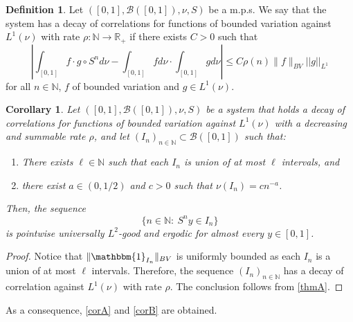 \documentclass[11pt]{amsart}
\numberwithin{equation}{section}
\newtheorem{corollary}[lemma]{Corollary}
\theoremstyle{definition}
\newtheorem{definition}[lemma]{Definition}
\theoremstyle{plain}
\newcommand{\N}{{\mathbb N}}
\begin{document}
\begin{definition}
    Let $([0,1],\mathcal{B}([0,1]),\nu,S)$ be a m.p.s. We say that the system has a decay of correlations for functions of bounded variation against $L^1(\nu)$ with rate $\rho\colon\N\to \mathbb{R}_{+}$ if there exists $C>0$ such that
    \[\left|\int_{[0,1]} f\cdot g\circ S^nd\nu-\int_{[0,1]} fd\nu \cdot \int_{[0,1]} gd\nu \right|\leq C\rho(n)\|f\|_{BV}||g||_{L^{1}}\]
    for all $n\in\N$, $f$ of bounded variation and $g\in L^1(\nu)$. \label{def:correlationsBV}
\end{definition} 

\begin{corollary}
  Let $([0,1],\mathcal{B}([0,1]),\nu,S)$ be a system that holds a decay of correlations for functions of bounded variation against $L^1(\nu)$ with a decreasing and summable rate $\rho$, and let $(I_n)_{n\in \N}\subset \mathcal{B}([0,1])$ such that:
  \begin{enumerate}
      \item There exists $\ell \in \N$ such that each $I_n$ is union of at most $\ell$ intervals, and
      \item there exist $a\in (0,1/2)$ and $c>0$ such that $\nu(I_n)=cn^{-a}$.
  \end{enumerate}
  Then, the sequence \[\{n\in \N:\ S^ny\in I_n\}\]
  is pointwise universally $L^2$-good and ergodic for almost every $y\in [0,1]$.\label{cor}
\end{corollary}
\begin{proof}
     Notice that $\|\mathbbm{1}_{I_n}\|_{BV}$ is uniformly bounded as each $I_n$ is a union of at most $\ell$ intervals. Therefore, the sequence $(I_n)_{n\in\N}$ has a decay of correlation against $L^1(\nu)$ with rate $\rho$. The conclusion follows from  \cref{thmA}.
\end{proof}

As a consequence, \cref{corA} and \cref{corB} are obtained.
\medskip
\end{document}
